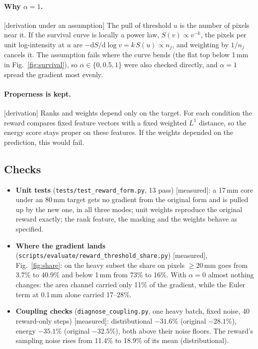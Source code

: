 \documentclass[11pt,a4paper]{article}
\newcommand{\status}[1]{\textsf{\small[#1]}}
\begin{document}
\paragraph{Why $\alpha = 1$.} \status{derivation under an assumption} The pull of threshold $u$ is the number of pixels
near it. If the survival curve is locally a power law, $S(v)\propto v^{-k}$, the pixels per unit log-intensity at $u$
are $-\mathrm dS/\mathrm d\log v = k\,S(u)\propto n_j$, and weighting by $1/n_j$ cancels it. The assumption fails where
the curve bends (the flat top below 1\,mm in Fig.~\ref{fig:survival}), so $\alpha\in\{0,0.5,1\}$ were also checked
directly, and $\alpha = 1$ spread the gradient most evenly.

\paragraph{Properness is kept.} \status{derivation} Ranks and weights depend only on the target. For each condition the
reward compares fixed feature vectors with a fixed weighted $L^1$ distance, so the energy score stays proper on these
features. If the weights depended on the prediction, this would fail.

\subsection{Checks}
\begin{itemize}[leftmargin=1.2em]
\item \textbf{Unit tests} (\texttt{tests/test\_reward\_form.py}, 13 pass) \status{measured}: a 17\,mm core under an
80\,mm target gets no gradient from the original form and is pulled up by the new one, in all three modes; unit weights
reproduce the original reward exactly; the rank feature, the masking and the weights behave as specified.
\item \textbf{Where the gradient lands} (\texttt{scripts/evaluate/reward\_threshold\_share.py}) \status{measured},
Fig.~\ref{fig:share}: on the heavy subset the share on pixels $\ge20$\,mm goes from 3.7\% to 40.9\% and below 1\,mm from
73\% to 16\%. With $\alpha = 0$ almost nothing changes: the area channel carried only 11\% of the gradient, while the
Euler term at 0.1\,mm alone carried 17--28\%.
\item \textbf{Coupling checks} (\texttt{diagnose\_coupling.py}, one heavy batch, fixed noise, 40 reward-only steps)
\status{measured}: distributional $-31.6\%$ (original $-28.1\%$), energy $-35.1\%$ (original $-32.5\%$), both above
their noise floors. The reward's sampling noise rises from 11.4\% to 18.9\% of its mean (distributional).
\end{itemize}
\end{document}
